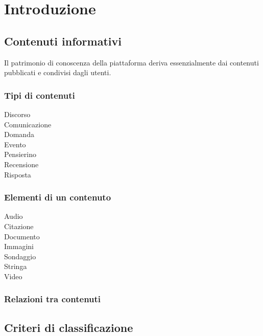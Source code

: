 \chapter{Introduzione}
\label{ch:intro}
\section{Contenuti informativi}
\label{sec:intro:contenuti}
Il patrimonio di conoscenza della piattaforma deriva essenzialmente dai contenuti pubblicati e condivisi dagli utenti.

\subsection{Tipi di contenuti}
\begin{description}
\item[Discorso]
\item[Comunicazione]
\item[Domanda]
\item[Evento]
\item[Pensierino]
\item[Recensione]
\item[Risposta]
\end{description}

\subsection{Elementi di un contenuto}
\begin{description}
\item[Audio]
\item[Citazione]
\item[Documento]
\item[Immagini]
\item[Sondaggio]
\item[Stringa]
\item[Video] 
\end{description}

\subsection{Relazioni tra contenuti}

\section{Criteri di classificazione}
\label{sec:intro:classificazione}

